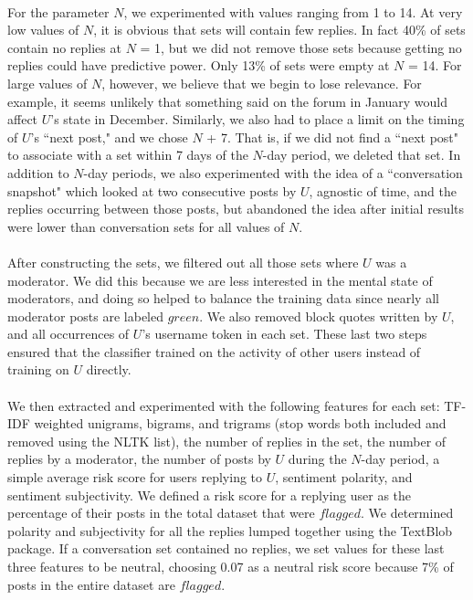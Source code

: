 \documentclass{article}
\begin{document}
\paragraph{}For the parameter $N$, we experimented with values ranging from 1 to 14. At very low values of $N$, it is obvious that sets will contain few replies. In fact 40\% of sets contain no replies at $N$ = 1, but we did not remove those sets because getting no replies could have predictive power. Only 13\% of sets were empty at $N$ = 14. For large values of $N$, however, we believe that we begin to lose relevance. For example, it seems unlikely that something said on the forum in January would affect $U$'s state in December. Similarly, we also had to place a limit on the timing of $U$'s ``next post," and we chose $N$ + 7. That is, if we did not find a ``next post" to associate with a set within 7 days of the $N$-day period, we deleted that set. In addition to $N$-day periods, we also experimented with the idea of a ``conversation snapshot" which looked at two consecutive posts by $U$, agnostic of time, and the replies occurring between those posts, but abandoned the idea after initial results were lower than conversation sets for all values of $N$.

\paragraph{}After constructing the sets, we filtered out all those sets where $U$ was a moderator. We did this because we are less interested in the mental state of moderators, and doing so helped to balance the training data since nearly all moderator posts are labeled $green$. We also removed block quotes written by $U$, and all occurrences of $U$'s username token in each set. These last two steps ensured that the classifier trained on the activity of other users instead of training on $U$ directly.

\paragraph{}We then extracted and experimented with the following features for each set: TF-IDF weighted unigrams, bigrams, and trigrams (stop words both included and removed using the NLTK list), the number of replies in the set, the number of replies by a moderator, the number of posts by $U$ during the $N$-day period, a simple average risk score for users replying to $U$, sentiment polarity, and sentiment subjectivity. We defined a risk score for a replying user as the percentage of their posts in the total dataset that were $flagged$. We determined polarity and subjectivity for all the replies lumped together using the TextBlob package. If a conversation set contained no replies, we set values for these last three features to be neutral, choosing 0.07 as a neutral risk score because 7\% of posts in the entire dataset are $flagged$.
\end{document}
